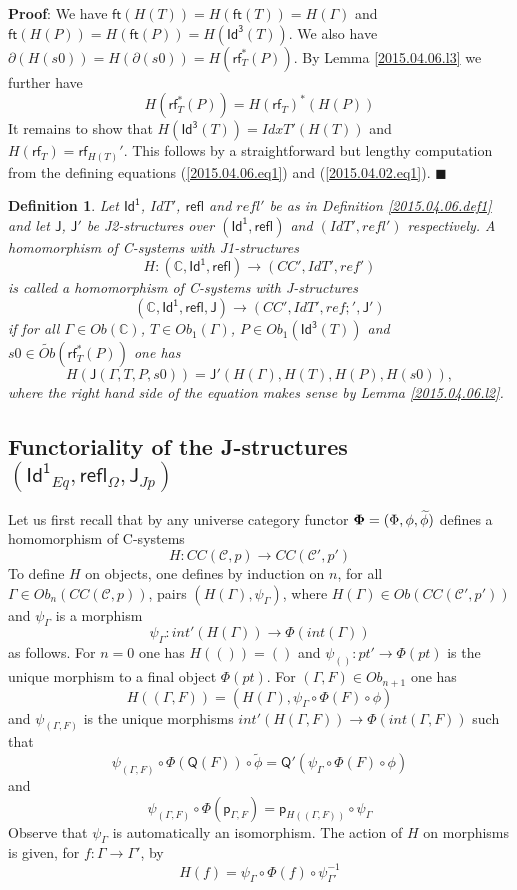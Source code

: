 \documentclass[12pt]{article}
\numberwithin{equation}{section}
\newenvironment{myproof}{{\bf Proof}:}{$\blacksquare$ \vskip 5mm }
\newtheorem{definition}[proposition]{Definition}
\newcommand{\llabel}[1]{\label{#1}}
\newcommand{\sr}{\rightarrow}
\newcommand{\wt}{\widetilde}
\newcommand{\toCC}{CC} %
\newcommand{\aCC}{{\mathbb C}}  %
\newcommand{\ft}{\mathsf{ft}}
\newcommand{\p}{\mathsf{p}}
\newcommand{\Id}{\mathsf{Id^1}} %
\newcommand{\Idx}{\mathsf{Id^3}} %
\newcommand{\refl}{\mathsf{refl}}
\newcommand{\J}{\mathsf{J}}
\newcommand{\rf}{\mathsf{rf}}
\newcommand{\Q}{\mathsf{Q}}
\begin{document}
%
\begin{myproof}
We have $\ft(H(T))=H(\ft(T))=H(\Gamma)$ and $\ft(H(P))=H(\ft(P))=H(\Idx(T))$. We
also have $\partial(H(s0))=H(\partial(s0))=H(\rf_T^*(P))$. By Lemma
\ref{2015.04.06.l3} we further have
%
$$H(\rf_T^*(P))=H(\rf_T)^*(H(P))$$
%
It remains to show that $H(\Idx(T))=IdxT'(H(T))$ and $H(\rf_T)=\rf_{H(T)}'$. This
follows by a straightforward but lengthy computation from the defining
equations (\ref{2015.04.06.eq1}) and (\ref{2015.04.02.eq1}).
\end{myproof}
%
\begin{definition}
\llabel{2015.04.06.def2} Let $\Id$, $IdT'$, $\refl$ and $refl'$ be as in
Definition \ref{2015.04.06.def1} and let $\J$, $\J'$ be J2-structures over
$(\Id,\refl)$ and $(IdT',refl')$ respectively. A homomorphism of C-systems with
J1-structures
%
$$H:(\aCC,\Id,\refl)\sr (CC',IdT',ref')$$
%
is called a homomorphism of C-systems with J-structures
%
$$(\aCC,\Id,\refl,\J)\sr (CC',IdT',ref;',\J')$$
%
if for all $\Gamma\in Ob(\aCC)$, $T\in Ob_1(\Gamma)$, $P\in Ob_1(\Idx(T))$ and
$s0\in \wt{Ob}(\rf_T^*(P))$ one has
%
$$H(\J(\Gamma,T,P,s0))=\J'(H(\Gamma),H(T),H(P),H(s0)),$$
%
where the right hand side of the equation makes sense by Lemma
\ref{2015.04.06.l2}.
\end{definition}
%











\subsection{Functoriality of the J-structures $(\Id_{Eq},\refl_{\Omega},\J_{Jp})$}
%
\label{2015.04.12.sec1}
%
Let us first recall that by \cite[Construction 3.3]{Cfromauniverse} any
universe category functor ${\bf \Phi}=(\Phi,\phi,\wt{\phi})$ defines a
homomorphism of C-systems
%
$$H:\toCC({\mathcal C},p)\sr \toCC({\mathcal C}',p')$$
%
To define $H$ on objects, one defines by induction on $n$, for all $\Gamma\in
Ob_n(\toCC({\mathcal C},p))$, pairs $(H(\Gamma),\psi_{\Gamma})$, where
$H(\Gamma)\in Ob(\toCC({\mathcal C}',p'))$ and $\psi_{\Gamma}$ is a morphism
%
$$\psi_{\Gamma}:int'(H(\Gamma))\sr \Phi(int(\Gamma))$$
%
as follows. For $n=0$ one has $H(())=()$ and $\psi_{()}:pt'\sr \Phi(pt)$ is the
unique morphism to a final object $\Phi(pt)$. For $(\Gamma,F)\in Ob_{n+1}$ one
has
%
$$H((\Gamma,F))=(H(\Gamma),\psi_{\Gamma}\circ\Phi(F)\circ \phi)$$
%
and $\psi_{(\Gamma,F)}$ is the unique morphisms $int'(H(\Gamma,F))\sr
\Phi(int(\Gamma,F))$ such that
%
$$\psi_{(\Gamma,F)}\circ
\Phi(\Q(F))\circ\wt{\phi}=\Q'(\psi_{\Gamma}\circ\Phi(F)\circ\phi)$$
%
and
%
$$\psi_{(\Gamma,F)}\circ \Phi(\p_{\Gamma,F})=\p_{H((\Gamma,F))}\circ
\psi_{\Gamma}$$
%
Observe that $\psi_{\Gamma}$ is automatically an isomorphism. The action of $H$
on morphisms is given, for $f:\Gamma\sr\Gamma'$, by
%
$$H(f)=\psi_{\Gamma}\circ\Phi(f)\circ\psi_{\Gamma'}^{-1}$$
%
\end{document}
